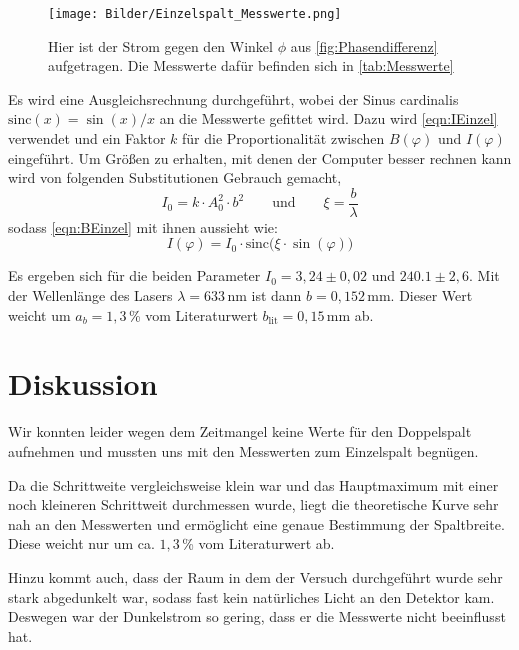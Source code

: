 \documentclass[titlepage = firstcover]{scrartcl}
\begin{document}
        \begin{figure}[h]
            \centering
            \texttt{[image: Bilder/Einzelspalt\_Messwerte.png]}
            \caption{Hier ist der Strom gegen den Winkel $\phi$ aus \autoref{fig:Phasendifferenz} aufgetragen. Die Messwerte dafür befinden sich in \autoref{tab:Messwerte}}
            \label{fig:Einzelspalt_Messwerte}
        \end{figure}

        \FloatBarrier

        Es wird eine Ausgleichsrechnung durchgeführt, wobei der Sinus cardinalis \\ $\text{sinc}(x) = \sin(x) / x$ an die Messwerte gefittet wird. Dazu wird \autoref{eqn:IEinzel} verwendet und ein Faktor $k$ für die Proportionalität zwischen $B(\varphi)$ und $I(\varphi)$ eingeführt. Um Größen zu erhalten, mit denen der Computer besser rechnen kann wird von folgenden Substitutionen Gebrauch gemacht,
        \begin{equation*}
            I_0 = k \cdot A_0^2 \cdot b^2 \qquad \text{und} \qquad \xi = \frac{b}{\lambda}
        \end{equation*}
        sodass \autoref{eqn:BEinzel} mit ihnen aussieht wie:
        \begin{equation*}
            I(\varphi) = I_0 \cdot \text{sinc}\bigl(\xi \cdot \sin(\varphi)\bigr)
        \end{equation*}

        Es ergeben sich für die beiden Parameter $I_0 = 3,24 \pm 0,02$ und $240.1 \pm 2,6$. Mit der Wellenlänge des Lasers $\lambda = 633\,$nm ist dann $b = 0,152\,$mm. Dieser Wert weicht um $a_b = 1,3\,$\% vom Literaturwert $b_{\text{lit}} = 0,15\,$mm ab. 


        \newpage
        \section{Diskussion}
            Wir konnten leider wegen dem Zeitmangel keine Werte für den Doppelspalt aufnehmen und mussten uns mit den Messwerten zum Einzelspalt begnügen.

            Da die Schrittweite vergleichsweise klein war und das Hauptmaximum mit einer noch kleineren Schrittweit durchmessen wurde, liegt die theoretische Kurve sehr nah an den Messwerten und ermöglicht eine genaue Bestimmung der Spaltbreite. Diese weicht nur um ca. $1,3\,$\% vom Literaturwert ab.

            Hinzu kommt auch, dass der Raum in dem der Versuch durchgeführt wurde sehr stark abgedunkelt war, sodass fast kein natürliches Licht an den Detektor kam. Deswegen war der Dunkelstrom so gering, dass er die Messwerte nicht beeinflusst hat.
\end{document}
